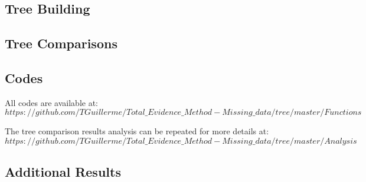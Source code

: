 \subsection{Tree Building}
  
  \label{Supp_TreeBuilding}

\subsection{Tree Comparisons}
  
  \label{Supp_TreeComparison}

\subsection{Codes}
All codes are available at: $https://github.com/TGuillerme/Total\_Evidence\_Method-Missing\_data/tree/master/Functions$

The tree comparison results analysis can be repeated for more details at: $https://github.com/TGuillerme/Total\_Evidence\_Method-Missing\_data/tree/master/Analysis$ %

\subsection{Additional Results}
  
  \label{Supp_results}